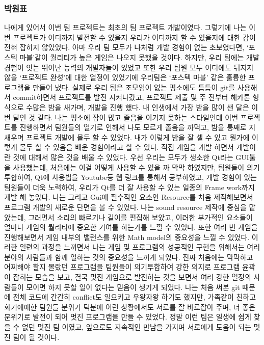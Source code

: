\documentclass[10pt,oneside,a4paper,titlepage]{article}
\begin{document}
\subsubsection{박원표}
나에게 있어서 이번 팀 프로젝트는 최초의 팀 프로젝트 개발이였다. 그렇기에 나는 이번 프로젝트가 어디까지 발전할 수 있을지 우리가 어디까지 할 수 있을지에 대한 감이 전혀 잡히지 않았었다. 아마 우리 팀 모두가 나처럼 개발 경험이 없는 초보였다면, ‘포스텍 마블’같이 퀄리티가 높은 게임은 나오지 못했을 것이다. 하지만, 우리 팀에는 개발 경험이 잇는 뛰어난 능력의 개발자들이 있었고 또한 우리 팀원 모두 어디에도 뒤지지 않을 ‘프로젝트 완성’에 대한 열정이 있었기에 우리팀은 ‘포스텍 마블’ 같은 훌륭한 프로그램을 만들어 냈다. 실제로 우리 팀은 조모임이 없는 평소에도 틈틈이 git를 사용해서 commit하면서 프로젝트를 발전 시켜나갔고, 프로젝트 제출 몇 주 전부터 해카톤 형식으로 수많은 밤을 새가며, 개발을 진행 했다.  내 인생에서 가장 밤을 많이 샌 달은 이번 달인 것 같다. 나는 평소에 잠이 많고 졸음을 이기지 못하는 스타일인데 이번 프로젝트를 진행하면서 팀원들의 열기로 인해서 나도 모르게 졸음을 까먹고, 밤을 통째로 지새우며 프로젝트 개발에 몰두 할 수 있었다. 내가 이렇게 밤을 잘 셀 수 있고 뭔가에 이렇게 몰두 할 수 있음을 배운 경험이라고 할 수 있다.
직접 게임을 개발 하면서 개발이란 것에 대해서 많은 것을 배울 수 있었다. 우선 우리는 모두가 생소한 Qt라는 GUI툴을 사용했는데, 처음에는 이걸 어떻게 사용할 수 있을 까 막막 하였지만, 팀원들이 의기 투합하여, Qt에 사용법을 Youtube등 웹 링크를 통해서 공부하였고, 개발 경험이 있는 팀원들이 더욱 노력하여, 우리가 Qt를 더 잘 사용할 수 있는 일종의 Frame work까지 개발 해 놓았다. 나는 그리고 Gui에 필수적인 요소인 Resource를 처음 제작해보면서 프로그램 개발의 새로운 단면을 볼 수 있었다. 나는 sound resource 제작에 중심을 맡았는데, 그러면서 소리의 빠르기나 길이를 편집해 보았고, 이러한 부가적인 요소들이 얼마나 게임의 퀄리티에 중요한 기여를 하는가를 느낄 수 있었다. 또한 여러 번 게임을 진행해보면서 게임 내부의 밸런스를 위한 Math model의 중요성을 느낄 수 있었다. 이러한 일련의 과정을 느끼면서 나는 게임 및 프로그램의 성공적인 구현을 위해서는 여러 분야의 사람들과 함께 일하는 것의 중요성을 느끼게 되었다.
진짜 처음에는 막막하고 어찌해야 할지 몰랐던 프로그램을 팀원들이 의기투합하여 강한 의지로 프로그램 윤곽이 잡히는 모습을 보고, 결국 멋진 게임으로 발전하는 것을 보면서 여러 강한 열정의 사람들이 모이면 하지 못할 일이 없다는 믿음이 생기게 되었다. 나는 처음 써본 git 때문에 전체 코드에 간간히 conflict도 일으키고 우왕자왕 하기도 했지만, 가족같이 친하고 화기애애한 팀원들 분위기 덕분에 이런 상황에서도 서로를 잘 바로잡아 주며, 더 좋은 분위기로 발전이 되어 멋진 프로그램을 만들 수 있었다. 정말 이런 팀은 일생에 쉽게 찾을 수 없던 멋진 팀 이였고, 앞으로도 지속적인 만남을 가지며 서로에게 도움이 되는 멋진 팀이 될 것이다. 
\end{document}
